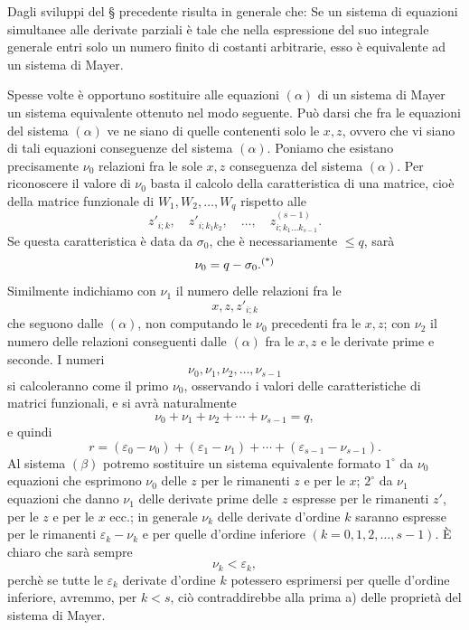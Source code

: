 \documentclass[11pt]{book}
\begin{document}
Dagli sviluppi del \S{} precedente risulta in generale che: Se un sistema di equazioni simultanee alle derivate parziali è tale che nella espressione del suo integrale generale entri solo un numero finito di costanti arbitrarie, esso è equivalente ad un sistema di Mayer.

Spesse volte è opportuno sostituire alle equazioni $(\alpha)$ di un sistema di Mayer un sistema equivalente ottenuto nel modo seguente. Può darsi che fra le equazioni del sistema $(\alpha)$ ve ne siano di quelle contenenti solo le $x,z$, ovvero che vi siano di tali equazioni conseguenze del sistema $(\alpha)$. Poniamo che esistano precisamente $\nu_0$ relazioni fra le sole $x,z$ conseguenza del sistema $(\alpha)$. Per riconoscere il valore di $\nu_0$ basta il calcolo della caratteristica di una matrice, cioè della matrice funzionale di $W_1,W_2,\ldots,W_q$ rispetto alle
\[
 z'_{i;k},
 \quad z'_{i;k_1k_2},
 \quad \ldots,
 \quad z^{(s-1)}_{i;k_1\ldots k_{s-1}}.
\]
Se questa caratteristica è data da $\sigma_0$, che è necessariamente $\le q$, sarà
\[
 \nu_0=q-\sigma_0.\begingroup\renewcommand\thefootnote{(*)}\footnotemark\endgroup
\]
\begingroup\renewcommand\thefootnote{(*)}\endgroup{}
Similmente indichiamo con $\nu_1$ il numero delle relazioni fra le
\[
 x,z,z'_{i;k}
\]
che seguono dalle $(\alpha)$, non computando le $\nu_0$ precedenti fra le $x,z$; con $\nu_2$ il numero delle relazioni conseguenti dalle $(\alpha)$ fra le $x,z$ e le derivate prime e seconde. I numeri
\[
 \nu_0,\nu_1,\nu_2,\ldots,\nu_{s-1}
\]
si calcoleranno come il primo $\nu_0$, osservando i valori delle caratteristiche di matrici funzionali, e si avrà naturalmente
\[
 \nu_0+\nu_1+\nu_2+\cdots+\nu_{s-1}=q,
\]
e quindi
\[
 r=(\varepsilon_0-\nu_0)+(\varepsilon_1-\nu_1)+\cdots+(\varepsilon_{s-1}-\nu_{s-1}).
\]
Al sistema $(\beta)$ potremo sostituire un sistema equivalente formato $1^{\circ}$ da $\nu_0$ equazioni che esprimono $\nu_0$ delle $z$ per le rimanenti $z$ e per le $x$; $2^{\circ}$ da $\nu_1$ equazioni che danno $\nu_1$ delle derivate prime delle $z$ espresse per le rimanenti $z'$, per le $z$ e per le $x$ ecc.; in generale $\nu_k$ delle derivate d'ordine $k$ saranno espresse per le rimanenti $\varepsilon_k-\nu_k$ e per quelle d'ordine inferiore $(k=0,1,2,\ldots,s-1)$. È chiaro che sarà sempre
\[
 \nu_k<\varepsilon_k,
\]
perchè se tutte le $\varepsilon_k$ derivate d'ordine $k$ potessero esprimersi per quelle d'ordine inferiore, avremmo, per $k<s$, ciò contraddirebbe alla prima a) delle proprietà del sistema di Mayer.
\end{document}
